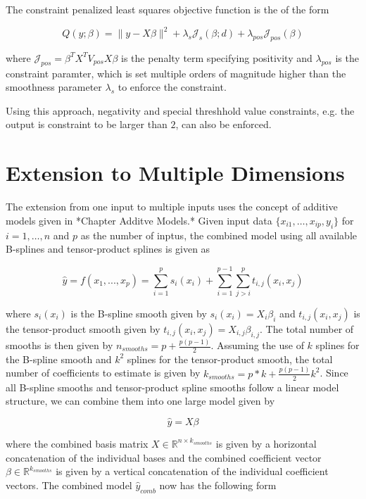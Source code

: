 \documentclass[10pt,a4paper]{article}
\begin{document}
	The constraint penalized least squares objective function is the of the form
	
	$$Q(y; \beta) = \lVert y - X\beta \rVert^2 + \lambda_s \mathcal J_s(\beta; d) + \lambda_{pos} \mathcal J_{pos}(\beta) $$
	
	where $\mathcal J_{pos} = \beta^T X^T V_{pos} X \beta$ is the penalty term specifying positivity and $\lambda_{pos}$ is the constraint paramter, which is set multiple orders of magnitude higher than the smoothness parameter $\lambda_s$ to enforce the constraint.
	
	Using this approach, negativity and special threshhold value constraints, e.g. the output is constraint to be larger than $2$, can also be enforced.
	
	\section{Extension to Multiple Dimensions}
	
	The extension from one input to multiple inputs uses the concept of additive models given in *Chapter Additve Models.* Given input data $\{ x_{i1}, \dots, x_{ip}, y_i\}$ for $i = 1, \dots, n$ and $p$ as the number of inptus, the combined model using all available B-splines and tensor-product splines is given as
	
	$$\hat y = f(x_1,..., x_p) = \sum_{i=1}^p s_i(x_i) + \sum_{i=1}^{p-1} \sum_{j>i}^p t_{i,j}(x_i, x_j) $$
	
	where $s_i(x_i)$ is the B-spline smooth given by $s_i(x_i) = X_i \beta_i$ and $t_{i, j}(x_i,x_j)$ is the tensor-product smooth given by $t_{i, j}(x_i,x_j) = X_{i,j} \beta_{i,j}$. The total number of smooths is then given by $n_{smooths} = p + \frac{p(p-1)}{2}$.  Assuming the use of $k$ splines for the B-spline smooth and $k^2$ splines for the tensor-product smooth, the total number of coefficients to estimate is given by $k_{smooths} = p*k + \frac{p(p-1)}{2}k^2$. Since all B-spline smooths and tensor-product spline smooths follow a linear model structure, we can combine them into one large model given by
	
	$$\hat y = X \beta$$
	
	where the combined basis matrix $X \in \mathbb{R}^{n \times k_{smooths}}$ is given by a horizontal concatenation of the individual bases and the combined coefficient vector $\beta \in \mathbb{R}^{k_{smooths}}$ is given by a vertical concatenation of the individual coefficient vectors. The combined model $\hat y_{comb}$ now has the following form
		
\end{document}
